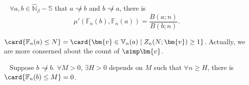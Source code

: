 \begin{theorem}~\label{thm:proportional-of-density-of-source-value-set}
	$\forall a, b \in \widehat{\mathbb{N}}_\beta - \mathbb{S}$ that $a\not\rightsquigarrow b$ and $b\not\rightsquigarrow a$, there is
	\[\mu'(\mathbb{F}_{n}(b), \mathbb{F}_{n}(a)) = \frac{B(a;n)}{B(b;n)}. \]
\end{theorem}
\begin{lemma}
	$\card\{\mathbb{F}_{n}(a) \le N\} = \card\{\bm{v} \in \mathbb{V}_{n}(a) \mid Z_{n}(N;\bm{v}) \ge 1 \}$. Actually, we are more conserned about the count of $\simp\bm{v}$.
\end{lemma}
\begin{lemma}~\label{lem:finite-layers-le-M}
	Suppose $b\not\rightsquigarrow b$.
	$\forall M > 0$, $\exists H > 0$ depends on $M$ such that $\forall n \ge H$, there is $\card\{ \mathbb{F}_{n}(b)\le M \} = 0$.
\end{lemma}
